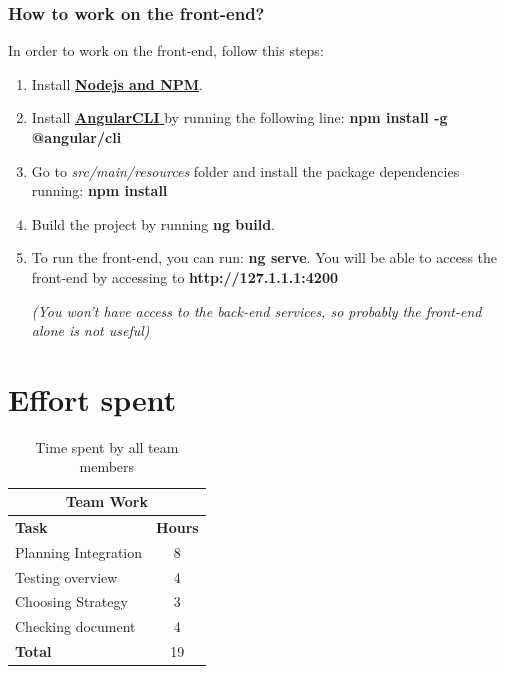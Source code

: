 \documentclass[a4paper, hidelinks, 12pt]{report}
\begin{document}
	\subsection{How to work on the front-end?}
	In order to work on the front-end, follow this steps:

	\begin{enumerate}
	\item Install \href{https://nodejs.org/es/download/}{\textbf{Nodejs and NPM}}.
	\item Install \href{https://cli.angular.io/}{\textbf{AngularCLI }} by running the following line:\textbf{ npm install -g @angular/cli }
	\item Go to \textit{src/main/resources} folder and install the package dependencies running: \textbf{npm install}
	\item Build the project by running \textbf{ng build}.
	\item To run the front-end, you can run: \textbf{ng serve}. You will be able to access the front-end by accessing to \textbf{http://127.1.1.1:4200}

	\textit{(You won't have access to the back-end services, so probably the front-end alone is not useful)}
	\end{enumerate}

	\chapter{Effort spent}

	\begin{table}[h]
		\centering
		\begin{tabular}{l c}
			\hline\hline
			\multicolumn{2}{c}{\textbf{Team Work}} \\
			\hline
			\textbf{Task} & \textbf{Hours} \\ [0.5ex]
			\hline
			Planning Integration & 8  \\
			Testing overview & 4\\
			Choosing Strategy & 3\\
			Checking document  & 4  \\
			\hline
			\textbf{Total} & 19  \\
			\hline
		\end{tabular}
		\caption{Time spent by all team members}
		\label{fig:Time spent by all team members}
	\end{table}
\end{document}
